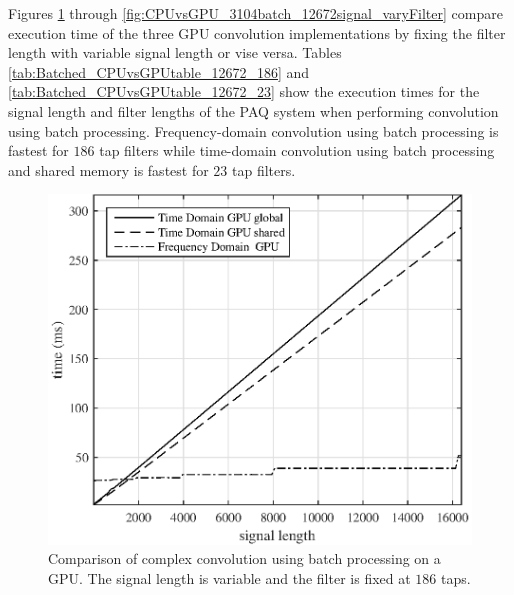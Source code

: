 Figures \ref{fig:CPUvsGPU_3104batch_186taps_varySignal} through \ref{fig:CPUvsGPU_3104batch_12672signal_varyFilter} 
compare execution time of the three GPU convolution implementations by fixing the filter length with variable signal length or vise versa.
Tables \ref{tab:Batched_CPUvsGPUtable_12672_186} and \ref{tab:Batched_CPUvsGPUtable_12672_23} 
show the execution times for the signal length and filter lengths of the PAQ system when performing convolution using batch processing.
Frequency-domain convolution using batch processing is fastest for $186$ tap filters while 
time-domain convolution using batch processing and shared memory is fastest for $23$ tap filters.
\begin{figure}
	\centering\includegraphics[width=5in]{figures/gpu_intro/CPUvsGPU_3104batch_186taps_varySignal.eps}
	\caption{Comparison of complex convolution using batch processing on a GPU. The signal length is variable and the filter is fixed at $186$ taps.}
	\label{fig:CPUvsGPU_3104batch_186taps_varySignal}
\end{figure}
